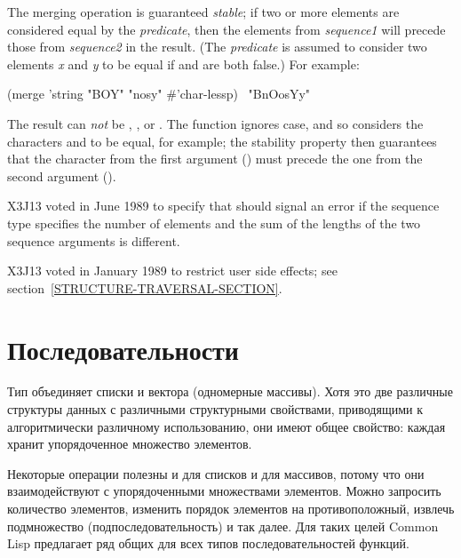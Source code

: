 \begin{defun}[Function]
The merging operation is guaranteed
\emph{stable}; if two or more elements are considered equal by the
\emph{predicate}, then the elements from \emph{sequence1} will
precede those from \emph{sequence2} in the result.
(The \emph{predicate} is assumed to
consider two elements \emph{x} and \emph{y} to be equal if
 and
 are both false.)
For example:
\begin{lisp}
(merge 'string "BOY" "nosy" \#'char-lessp) \EV\ "BnOosYy"
\end{lisp}
The result can \emph{not} be , , or .
The function  ignores case, and so considers
the characters  and  to be equal, for example;
the stability property then guarantees that the character from the
first argument () must precede the one from the second
argument ().

\begin{newer}
X3J13 voted in June 1989  to specify that
 should signal an error if the sequence type specifies the number of
elements and the sum of the lengths of the two sequence arguments is
different.
\end{newer}

\begin{new}
X3J13 voted in January 1989
to restrict user side effects; see section~\ref{STRUCTURE-TRAVERSAL-SECTION}.
\end{new}
\end{defun}

\else

\chapter{Последовательности}
\label{KSEQUE}

Тип  объединяет списки и вектора (одномерные массивы).
Хотя это две различные структуры данных с различными структурными
свойствами, приводящими к алгоритмически различному использованию, они имеют
общее свойство: каждая хранит упорядоченное множество элементов.

Некоторые операции полезны и для списков и для массивов, потому что они
взаимодействуют с упорядоченными множествами элементов. Можно запросить
количество элементов, изменить порядок элементов на противоположный, извлечь
подмножество (подпоследовательность) и так далее. Для таких целей Common Lisp
предлагает ряд общих для всех типов последовательностей функций.

